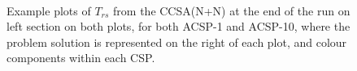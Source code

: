 \begin{figure}[htp]
	\hfill
	\\
	\caption{Example plots of $T_{rs}$ from the CCSA(N+N) at the end of the run on left section on both plots, for both ACSP-1 and ACSP-10, where the problem solution is represented on the right of each plot, and colour components within each CSP.}
	\label{fig:cells:ccsa:ccsa:plots} %
\end{figure}


